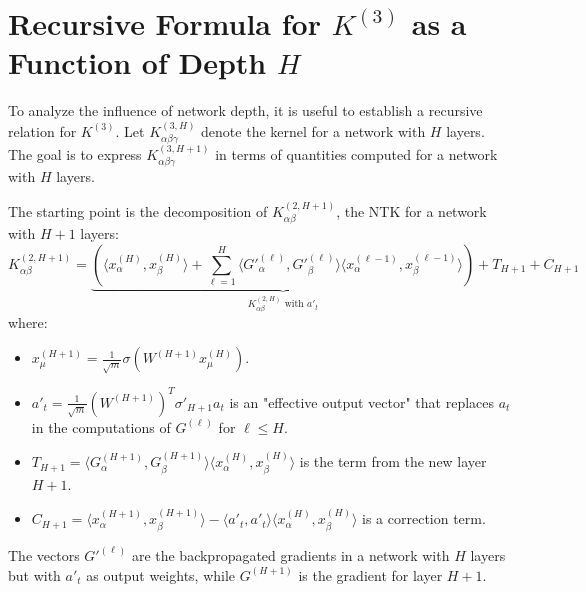 \documentclass[a4paper]{article}
\begin{document}
\newpage


\section{Recursive Formula for $K^{(3)}$ as a Function of Depth $H$}

To analyze the influence of network depth, it is useful to establish a recursive relation for $K^{(3)}$. Let $K^{(3, H)}_{\alpha\beta\gamma}$ denote the kernel for a network with $H$ layers. The goal is to express $K^{(3, H+1)}_{\alpha\beta\gamma}$ in terms of quantities computed for a network with $H$ layers.

The starting point is the decomposition of $K^{(2, H+1)}_{\alpha\beta}$, the NTK for a network with $H+1$ layers:
\begin{equation}
K^{(2, H+1)}_{\alpha\beta} = \underbrace{\left( \langle x^{(H)}_\alpha, x^{(H)}_\beta \rangle + \sum_{\ell=1}^{H} \langle G'^{(\ell)}_\alpha, G'^{(\ell)}_\beta \rangle \langle x^{(\ell-1)}_\alpha, x^{(\ell-1)}_\beta \rangle \right)}_{K^{(2,H)}_{\alpha\beta} \text{ with } a'_t} + T_{H+1} + C_{H+1}
\end{equation}
where:
\begin{itemize}
    \item $x^{(H+1)}_\mu = \frac{1}{\sqrt{m}}\sigma(W^{(H+1)} x^{(H)}_\mu)$.
    \item $a'_t = \frac{1}{\sqrt{m}} (W^{(H+1)})^T \sigma'_{H+1} a_t$ is an "effective output vector" that replaces $a_t$ in the computations of $G^{(\ell)}$ for $\ell \le H$.
    \item $T_{H+1} = \langle G^{(H+1)}_\alpha, G^{(H+1)}_\beta \rangle \langle x^{(H)}_\alpha, x^{(H)}_\beta \rangle$ is the term from the new layer $H+1$.
    \item $C_{H+1} = \langle x^{(H+1)}_\alpha, x^{(H+1)}_\beta \rangle - \langle a'_t, a'_t \rangle \langle x^{(H)}_\alpha, x^{(H)}_\beta \rangle$ is a correction term.
\end{itemize}
The vectors $G'^{(\ell)}$ are the backpropagated gradients in a network with $H$ layers but with $a'_t$ as output weights, while $G^{(H+1)}$ is the gradient for layer $H+1$.
\end{document}
